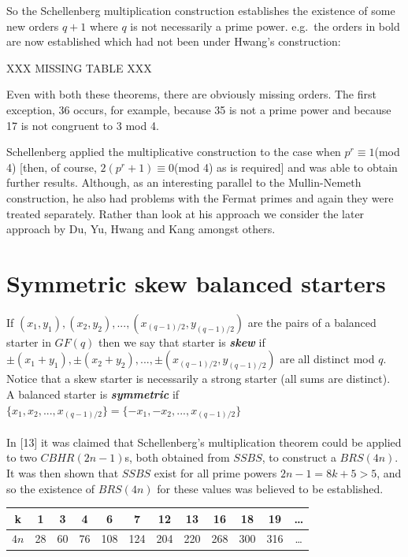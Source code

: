 \documentclass[
  11pt,
  a4paper]{book}
\begin{document}
So the Schellenberg multiplication construction establishes
the existence of some new orders \(q+1\) where \(q\) is not
necessarily a prime power. e.g.~the orders in bold are now
established which had not been under Hwang's construction:

XXX MISSING TABLE XXX

Even with both these theorems, there are obviously missing
orders. The first exception, 36 occurs, for example, because
35 is not a prime power and because 17 is not congruent to 3
mod 4.

Schellenberg applied the multiplicative construction to the
case when \(p^r \equiv 1\)(mod 4) {[}then, of course,
\(2(p^r+1) \equiv 0\)(mod 4) as is required{]} and was able to
obtain further results. Although, as an interesting parallel
to the Mullin-Nemeth construction, he also had problems with
the Fermat primes and again they were treated separately.
Rather than look at his approach we consider the later
approach by Du, Yu, Hwang and Kang amongst others.

\hypertarget{symmetric-skew-balanced-starters}{%
\section{Symmetric skew balanced starters}\label{symmetric-skew-balanced-starters}}

If \((x_1,y_1),(x_2,y_2), ...,(x_{(q-1)/2},y_{(q-1)/2})\) are the pairs of
a balanced starter in \(GF(q)\) then we say that starter is \textbf{\emph{skew}} if
\(\pm(x_1+y_1), \pm(x_2+y_2), ..., \pm(x_{(q-1)/2},y_{(q-1)/2})\) are all
distinct mod \(q\).\\
Notice that a skew starter is necessarily a strong starter (all sums are
distinct).\\
A balanced starter is \textbf{\emph{symmetric}} if
\(\{x_1,x_2,...,x_{(q-1)/2}\}=\{-x_1,-x_2,...,x_{(q-1)/2}\}\)\\
~\\
In {[}13{]} it was claimed that Schellenberg's multiplication theorem could
be applied to two \(CBHR(2n-1)\)s, both obtained from \(SSBS\), to construct
a \(BRS(4n)\). It was then shown that \(SSBS\) exist for all prime powers
\(2n-1=8k+5>5\), and so the existence of \(BRS(4n)\) for these values was
believed to be established.

\begin{longtable}[]{@{}cccccccccccc@{}}
\toprule
k & 1 & 3 & 4 & 6 & 7 & 12 & 13 & 16 & 18 & 19 & \ldots{}\tabularnewline
\midrule
\endhead
\(4n\) & 28 & 60 & 76 & 108 & 124 & 204 & 220 & 268 & 300 & 316 & \ldots{}\tabularnewline
\bottomrule
\end{longtable}
\end{document}
